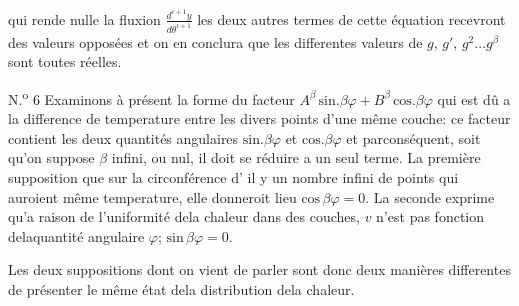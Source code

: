 \documentclass[11pt,a4paper]{article}
\begin{document}

qui rende nulle la fluxion $\frac{d^{i+1}y}{d\theta^{i+1}}$ 
les deux autres termes de cette équation recevront des valeurs
opposées et on en conclura que les differentes valeurs de
$g$, $g'$, $g^2 \ldots g^\beta$ sont toutes réelles.

N.\textsuperscript{o} 6 Examinons à présent la forme du facteur
$A^\beta\,\text{sin}.\beta\varphi + B^\beta\,\text{cos}.\beta\varphi$ qui est dû a la difference de temperature
entre les divers points d'une même couche: ce facteur
contient les deux quantités angulaires $\text{sin}.\beta\varphi$ et $\text{cos}.\beta\varphi$ et
parconséquent, soit qu'on suppose $\beta$ infini, ou nul, il
doit se réduire a un seul terme. La première supposition
 que sur la circonférence d' 
il y   un nombre infini de points qui auroient
   même temperature,  elle donneroit lieu
 $\text{cos}\,\beta\varphi = 0$. La seconde exprime qu'a raison de l'uniformité
dela chaleur dans      des couches,  $v$ n'est
pas fonction delaquantité angulaire $\varphi$;  
 $\text{sin}\,\beta\varphi = 0$.

Les deux suppositions dont on vient de parler  sont
donc  deux manières differentes de présenter 
 le même état dela distribution dela chaleur.
\end{document}
